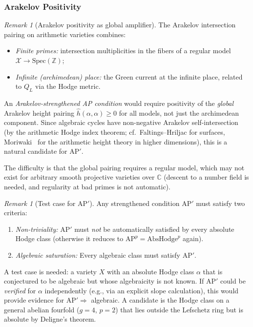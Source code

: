 \documentclass[aps,prd,twocolumn,superscriptaddress,nofootinbib]{revtex4-2}
\theoremstyle{definition}
\theoremstyle{remark}
\newtheorem{remark}[theorem]{Remark}
\begin{document}
\subsubsection{Arakelov Positivity}

\begin{remark}[Arakelov positivity as global amplifier]
\label{rem:arakelov-positivity}
The Arakelov intersection pairing on arithmetic varieties combines:
\begin{itemize}
\item \textit{Finite primes:} intersection multiplicities in the fibers of a regular model $\mathcal{X} \to \mathrm{Spec}(\mathbb{Z})$;
\item \textit{Infinite (archimedean) place:} the Green current at the infinite place, related to $Q_L$ via the Hodge metric.
\end{itemize}
An \textit{Arakelov-strengthened AP condition} would require positivity of the \textit{global} Arakelov height pairing $\hat{h}(\alpha, \alpha) \geq 0$ for all models, not just the archimedean component. Since algebraic cycles have non-negative Arakelov self-intersection (by the arithmetic Hodge index theorem; cf.\ Faltings--Hriljac for surfaces, Moriwaki~\cite{Moriwaki2000} for the arithmetic height theory in higher dimensions), this is a natural candidate for AP$'$.

The difficulty is that the global pairing requires a regular model, which may not exist for arbitrary smooth projective varieties over $\mathbb{C}$ (descent to a number field is needed, and regularity at bad primes is not automatic).
\end{remark}

\begin{remark}[Test case for AP$'$]
\label{rem:test-case-ap-prime}
Any strengthened condition AP$'$ must satisfy two criteria:
\begin{enumerate}
\item \textit{Non-triviality:} AP$'$ must \textit{not} be automatically satisfied by every absolute Hodge class (otherwise it reduces to $\mathrm{AP}^p = \mathrm{AbsHodge}^p$ again).
\item \textit{Algebraic saturation:} Every algebraic class must satisfy AP$'$.
\end{enumerate}
A test case is needed: a variety $X$ with an absolute Hodge class $\alpha$ that is conjectured to be algebraic but whose algebraicity is not known. If AP$'$ could be \textit{verified} for $\alpha$ independently (e.g., via an explicit slope calculation), this would provide evidence for AP$' \Rightarrow$ algebraic. A candidate is the Hodge class on a general abelian fourfold ($g = 4$, $p = 2$) that lies outside the Lefschetz ring but is absolute by Deligne's theorem.
\end{remark}
\end{document}
